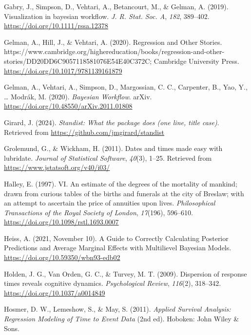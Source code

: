 \documentclass[
  man, donotrepeattitle,floatsintext]{apa6}
\newlength{\cslhangindent}
\newenvironment{CSLReferences}[2] %
 {\begin{list}{}{%
  \setlength{\itemindent}{0pt}
  \setlength{\leftmargin}{0pt}
  \setlength{\parsep}{0pt}
  \ifodd #1
   \setlength{\leftmargin}{\cslhangindent}
   \setlength{\itemindent}{-1\cslhangindent}
  \fi
  \setlength{\itemsep}{#2\baselineskip}}}
 {\end{list}}
\begin{document}
\begin{CSLReferences}{1}{0}
Gabry, J., Simpson, D., Vehtari, A., Betancourt, M., \& Gelman, A. (2019). Visualization in bayesian workflow. \emph{J. R. Stat. Soc. A}, \emph{182}, 389--402. \url{https://doi.org/10.1111/rssa.12378}

Gelman, A., Hill, J., \& Vehtari, A. (2020). Regression and {Other Stories}. https://www.cambridge.org/highereducation/books/regression-and-other-stories/DD20DD6C9057118581076E54E40C372C; Cambridge University Press. \url{https://doi.org/10.1017/9781139161879}

Gelman, A., Vehtari, A., Simpson, D., Margossian, C. C., Carpenter, B., Yao, Y., \ldots{} Modrák, M. (2020). \emph{Bayesian {Workflow}}. arXiv. \url{https://doi.org/10.48550/arXiv.2011.01808}

Girard, J. (2024). \emph{Standist: What the package does (one line, title case)}. Retrieved from \url{https://github.com/jmgirard/standist}

Grolemund, G., \& Wickham, H. (2011). Dates and times made easy with {lubridate}. \emph{Journal of Statistical Software}, \emph{40}(3), 1--25. Retrieved from \url{https://www.jstatsoft.org/v40/i03/}

Halley, E. (1997). {VI}. {An} estimate of the degrees of the mortality of mankind; drawn from curious tables of the births and funerals at the city of {Breslaw}; with an attempt to ascertain the price of annuities upon lives. \emph{Philosophical Transactions of the Royal Society of London}, \emph{17}(196), 596--610. \url{https://doi.org/10.1098/rstl.1693.0007}

Heiss, A. (2021, November 10). A Guide to Correctly Calculating Posterior Predictions and Average Marginal Effects with Multilievel {Bayesian} Models. \url{https://doi.org/10.59350/wbn93-edb02}

Holden, J. G., Van Orden, G. C., \& Turvey, M. T. (2009). Dispersion of response times reveals cognitive dynamics. \emph{Psychological Review}, \emph{116}(2), 318--342. \url{https://doi.org/10.1037/a0014849}

Hosmer, D. W., Lemeshow, S., \& May, S. (2011). \emph{Applied {Survival Analysis}: {Regression Modeling} of {Time} to {Event Data}} (2nd ed). Hoboken: John Wiley \& Sons.


\end{CSLReferences}
\end{document}
